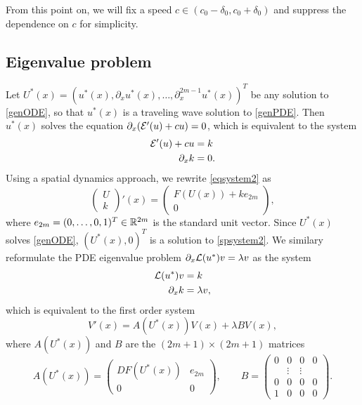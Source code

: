 \documentclass[10pt,reqno]{amsart}
\theoremstyle{plain}
\theoremstyle{definition}
\theoremstyle{remark}
\numberwithin{theorem}{section}
\numberwithin{equation}{section}
\begin{document}
\noi From this point on, we will fix a speed $c \in (c_0 - \delta_0, c_0 + \delta_0)$ and suppress the dependence on $c$ for simplicity.

\subsection{Eigenvalue problem}\label{sec:EVP}

Let $U^*(x) = (u^*(x), \partial_x u^*(x), \dots, \partial_x^{2m-1}u^*(x) )^T$ be any solution to \cref{genODE}, so that $u^*(x)$ is a traveling wave solution to \cref{genPDE}.
Then $u^*(x)$ solves the equation $\partial_x(\mathcal{E}'(u) + cu) = 0$, which is equivalent to the system
\begin{equation}\label{eqsystem2}
\begin{aligned}
\mathcal{E}'(u) + cu &= k \\
\partial_x k &= 0.
\end{aligned}
\end{equation}
Using a spatial dynamics approach, we rewrite \cref{eqsystem2} as
\begin{equation}\label{spsystem2}
\begin{pmatrix}
U \\ k
\end{pmatrix}'(x) =
\begin{pmatrix} 
F(U(x)) + k e_{2m} \\ 0
\end{pmatrix},
\end{equation}
where $e_{2m} = (0, \dots, 0, 1)^T \in \mathbb{R}^{2m}$ is the standard unit vector. Since $U^*(x)$ solves \cref{genODE}, $(U^*(x), 0)^T$ is a solution to \cref{spsystem2}. We similary reformulate the PDE eigenvalue problem $\partial_x \mathcal{L}(u^*) v = \lambda v$ as the system 
\begin{equation}\label{genPDEeig2}
\begin{aligned}
\mathcal{L}(u^*) v &= k \\
\partial_x k &= \lambda v,
\end{aligned}
\end{equation}
which is equivalent to the first order system 
\begin{equation}\label{PDEeigsystem}
V'(x) = A(U^*(x))V(x) + \lambda B V(x),
\end{equation}
where $A(U^*(x))$ and $B$ are the $(2m+1) \times (2m+1)$ matrices
\begin{equation}\label{defAB}
A(U^*(x)) = 
\begin{pmatrix}
DF(U^*(x)) & e_{2m}\\
0 & 0
\end{pmatrix}, \qquad
B = \begin{pmatrix}0 & 0 & 0 & 0 \\ & 
\vdots & \vdots & \\0 & 0 & 0 & 0 \\ 1 & 0 & 0 & 0 \end{pmatrix}.
\end{equation}
 
\end{document}
